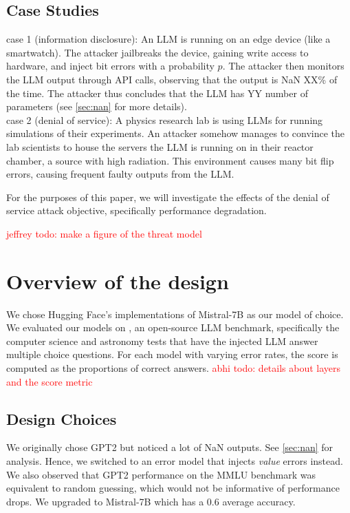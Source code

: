 \subsection{Case Studies}
case 1 (information disclosure): An LLM is running on an edge device (like a smartwatch). The attacker jailbreaks the device, gaining write access to hardware, and inject bit errors with a probability $p$. The attacker then monitors the LLM output through API calls, observing that the output is NaN XX\% of the time. The attacker thus concludes that the LLM has YY number of parameters (see \ref{sec:nan} for more details). \\

case 2 (denial of service): A physics research lab is using LLMs for running simulations of their experiments. An attacker somehow manages to convince the lab scientists to house the servers the LLM is running on in their reactor chamber, a source with high radiation. This environment causes many bit flip errors, causing frequent faulty outputs from the LLM.

For the purposes of this paper, we will investigate the effects of the denial of service attack objective, specifically performance degradation.


\textcolor{red}{jeffrey todo: make a figure of the threat model}



\section{Overview of the design}
\label{sec:overview}

We chose Hugging Face's implementations of Mistral-7B \cite{jiang2023mistral7b} as our model of choice. We evaluated our models on \cite{hendrycks2021measuringmassivemultitasklanguage}, an open-source LLM benchmark, specifically the computer science and astronomy tests that have the injected LLM answer multiple choice questions. For each model with varying error rates, the score is computed as the proportions of correct answers. \textcolor{red}{abhi todo: details about layers and the score metric}

\subsection{Design Choices}
We originally chose GPT2 but noticed a lot of NaN outputs. See \ref{sec:nan} for analysis. Hence, we switched to an error model that injects \textit{value} errors instead. \\

We also observed that GPT2 performance on the MMLU benchmark was equivalent to random guessing, which would not be informative of performance drops. We upgraded to Mistral-7B which has a 0.6 average accuracy.